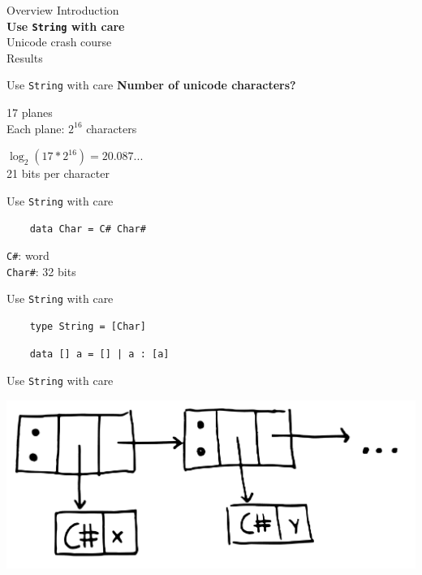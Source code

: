 \documentclass[20pt]{beamer}
\newcommand{\vspaced}{
    \vspace{5mm}
}
\begin{document}

\begin{frame}{Overview}
    Introduction \\
    \textbf{Use \texttt{String} with care} \\
    Unicode crash course \\
    Results \\
\end{frame}

\begin{frame}{Use \texttt{String} with care}
    \textbf{Number of unicode characters?} \\
    \vspaced
    17 planes \\
    Each plane: $2^{16}$ characters \\
    \vspaced
    $\log_2(17 * 2^{16}) = 20.087...$ \\
    21 bits per character \\
\end{frame}

\begin{frame}[fragile]{Use \texttt{String} with care}
    \begin{lstlisting}
    data Char = C# Char#
    \end{lstlisting}
    \texttt{C\#}: word \\
    \texttt{Char\#}: 32 bits \\
\end{frame}

\begin{frame}[fragile]{Use \texttt{String} with care}
    \begin{lstlisting}
    type String = [Char]
    \end{lstlisting}
    \vspaced
    \begin{lstlisting}
    data [] a = [] | a : [a]
    \end{lstlisting}
\end{frame}

\begin{frame}{Use \texttt{String} with care}
    \begin{center}
    \includegraphics[width=\textwidth]{../2011-dutchhug-text-utf8/images/string.pdf}
    \end{center}
\end{frame}
\end{document}
